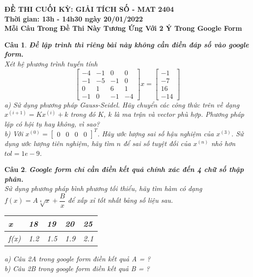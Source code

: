 \documentclass[11pt]{article}
\newtheorem{bt}{Câu}
\begin{document}


\begin{center}
	\textbf{ĐỀ THI CUỐI KỲ: GIẢI TÍCH SỐ - MAT 2404 \\ Thời gian: 13h - 14h30 ngày 20/01/2022 \\ Mỗi Câu Trong Đề Thi Này Tương Ứng Với 2 Ý Trong Google Form } 
\end{center}

\newcommand{\m}[1]{
	\begin{bmatrix}
		#1
	\end{bmatrix}
}

\begin{bt}\textbf{Đề lập trình thì riêng bài này không cần điền đáp số vào google form.} \\
Xét hệ phương trình tuyến tính
	\begin{equation}
		\m{-4 & -1 & 0 & 0 \\ -1 & -5 & -1 & 0 \\ 0 & 1 & 6 & 1 \\ -1 & 0 & -1 & -4} x = \m{-1 \\ -7 \\ 16 \\ -14}
	\end{equation}
	a) Sử dụng phương pháp Gauss-Seidel. Hãy chuyển các công thức trên về dạng $x^{(i+1)} = K x^{(i)} + k$ trong đó $K$, $k$ là ma trận và vector phù hợp. Phương pháp lặp có hội tụ hay không, vì sao? \\ 
	b) Với $x^{(0)}=\m{0 & 0 & 0 & 0}^T$. Hãy ước lượng sai số hậu nghiệm của $x^{(3)}$. Sử dụng ước lượng tiên nghiệm, hãy tìm $n$ để sai số tuyệt đối của $x^{(n)}$ nhỏ hơn $tol=1e-9$.
\end{bt}

\begin{bt} \textbf{Google form chỉ cần điền kết quả chính xác đến 4 chữ số thập phân.}\\
	Sử dụng phương pháp bình phương tối thiểu, hãy tìm hàm có dạng $f(x) = A \sqrt[4]{x}+ \dfrac{B}{x}$ để xấp xỉ tốt nhất bảng số liệu sau. 
	\begin{center}
		\begin{tabular}[5]{l|l|l|l|l}
			x    & 18  &  19  &  20  &  25 \\ \hline
			f(x) & 1.2 & 1.5  & 1.9  & 2.1
		\end{tabular}	
	\end{center}
	a) Câu 2A trong google form điền kết quả A = ? \\
	b) Câu 2B trong google form điền kết quả B = ? \\
\end{bt}
\end{document}
